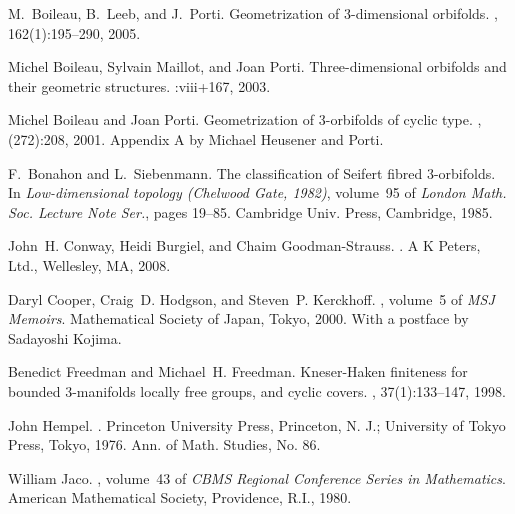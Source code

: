 \documentclass[12pt,reqno]{amsart}
\theoremstyle{plain}
\theoremstyle{definition}
\numberwithin{subcase}{case}
\theoremstyle{plain}
\theoremstyle{definition}
\begin{document}



\begin{thebibliography}{10}

M.~Boileau, B.~Leeb, and J.~Porti.
\newblock Geometrization of 3-dimensional orbifolds.
, 162(1):195--290, 2005.

Michel Boileau, Sylvain Maillot, and Joan Porti.
\newblock Three-dimensional orbifolds and their geometric structures.
:viii+167, 2003.

Michel Boileau and Joan Porti.
\newblock Geometrization of 3-orbifolds of cyclic type.
, (272):208, 2001.
\newblock Appendix A by Michael Heusener and Porti.

F.~Bonahon and L.~Siebenmann.
\newblock The classification of {S}eifert fibred {$3$}-orbifolds.
\newblock In {\em Low-dimensional topology ({C}helwood {G}ate, 1982)},
  volume~95 of {\em London Math. Soc. Lecture Note Ser.}, pages 19--85.
  Cambridge Univ. Press, Cambridge, 1985.

John~H. Conway, Heidi Burgiel, and Chaim Goodman-Strauss.
.
\newblock A K Peters, Ltd., Wellesley, MA, 2008.

Daryl Cooper, Craig~D. Hodgson, and Steven~P. Kerckhoff.
, volume~5 of
  {\em MSJ Memoirs}.
\newblock Mathematical Society of Japan, Tokyo, 2000.
\newblock With a postface by Sadayoshi Kojima.

Benedict Freedman and Michael~H. Freedman.
\newblock Kneser-{H}aken finiteness for bounded {$3$}-manifolds locally free
  groups, and cyclic covers.
, 37(1):133--147, 1998.

John Hempel.
.
\newblock Princeton University Press, Princeton, N. J.; University of Tokyo
  Press, Tokyo, 1976.
\newblock Ann. of Math. Studies, No. 86.

William Jaco.
, volume~43 of {\em CBMS
  Regional Conference Series in Mathematics}.
\newblock American Mathematical Society, Providence, R.I., 1980.


\end{thebibliography}
\end{document}
